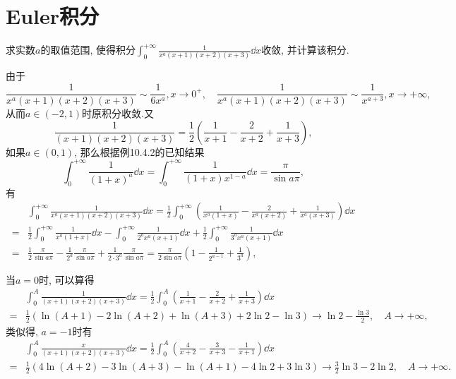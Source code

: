 \section{Euler积分}
\begin{quiza}
\woe 求实数\(a\)的取值范围, 使得积分\(\int_{0}^{+\infty}\frac{1}{x^a(x+1)(x+2)(x+3)}\dd x\)收敛, 并计算该积分.
\begin{solution}
由于\[\frac{1}{x^a(x+1)(x+2)(x+3)}\sim\frac{1}{6x^a},x\rightarrow 0^+,\quad \frac{1}{x^a(x+1)(x+2)(x+3)}\sim\frac{1}{x^{a+3}},x\rightarrow+\infty,\]从而\(a\in(-2,1)\)时原积分收敛.又\[\frac{1}{(x+1)(x+2)(x+3)}=\frac{1}{2}\left(\frac{1}{x+1}-\frac{2}{x+2}+\frac{1}{x+3}\right),\]如果\(a\in(0,1)\), 那么根据例10.4.2的已知结果\[\int_{0}^{+\infty}\frac{1}{(1+x)^a}\dd x=\int_{0}^{+\infty}\frac{1}{(1+x)x^{1-a}}\dd x=\frac{\pi}{\sin a\pi},\]有\[\begin{split}
	&\int_{0}^{+\infty}\frac{1}{x^a(x+1)(x+2)(x+3)}\dd x=\frac{1}{2}\int_{0}^{+\infty}\left(\frac{1}{x^a(1+x)}-\frac{2}{x^a(x+2)}+\frac{1}{x^a(x+3)}\right)\dd x\\=&\frac{1}{2}\int_{0}^{+\infty}\frac{1}{x^a(1+x)}\dd x-\int_{0}^{+\infty}\frac{1}{2^ax^a(x+1)}\dd x+\frac{1}{2}\int_{0}^{+\infty}\frac{1}{3^ax^a(x+1)}\dd x\\=&\frac{1}{2}\frac{\pi}{\sin a\pi}-\frac{1}{2^a}\frac{\pi}{\sin a\pi}+\frac{1}{2\cdot 3^a}\frac{\pi}{\sin a\pi}=\frac{\pi}{2\sin a\pi}\left(1-\frac{1}{2^{a-1}}+\frac{1}{3^a}\right),
\end{split}\]

当\(a=0\)时, 可以算得\[\begin{split}
	&\int_{0}^{A}\frac{1}{(x+1)(x+2)(x+3)}\dd x=\frac{1}{2}\int_{0}^{A}\left(\frac{1}{x+1}-\frac{2}{x+2}+\frac{1}{x+3}\right)\dd x\\=&\frac{1}{2}\left(\ln(A+1)-2\ln(A+2)+\ln(A+3)+2\ln 2-\ln 3\right)\rightarrow \ln 2-\frac{\ln 3}{2},\quad A\rightarrow+\infty,
\end{split}\]类似得, \(a=-1\)时有\[\begin{split}
&\int_{0}^{A}\frac{x}{(x+1)(x+2)(x+3)}\dd x=\frac{1}{2}\int_{0}^{A}\left(\frac{4}{x+2}-\frac{3}{x+3}-\frac{1}{x+1}\right)\dd x\\=&\frac{1}{2}\left(4\ln(A+2)-3\ln(A+3)-\ln(A+1)-4\ln 2+3\ln 3\right)\rightarrow\frac{3}{2}\ln 3-2\ln 2,\quad A\rightarrow+\infty.
\end{split}\]


\end{solution}
\end{quiza}
